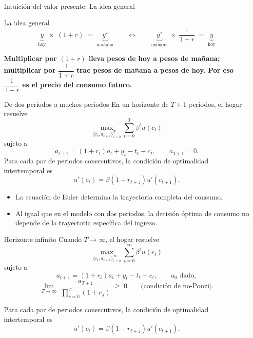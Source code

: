 \documentclass[aspectratio=169,11pt]{beamer}
\newcommand{\cidehighlight}[1]{\textcolor{CIDEBlue}{\bfseries #1}}
\newcommand{\notafuentes}[1]{\note{[Sources] #1}}
\begin{document}
\begin{frame}{Intuición del valor presente: La idea general}
    \vspace{0.5em}
  \begin{block}{La idea general}
    \[
      \underbrace{y}_{\text{hoy}} \;\times\; (1+r) \;=\; \underbrace{y'}_{\text{mañana}}
      \qquad\Longleftrightarrow\qquad
      \underbrace{y'}_{\text{mañana}} \;\times\; \frac{1}{1+r} \;=\; \underbrace{y}_{\text{hoy}}
    \]
  \end{block}

  \cidehighlight{Multiplicar por \((1+r)\) lleva pesos de hoy a pesos de
  mañana; multiplicar por \(\dfrac{1}{1+r}\) trae pesos de mañana a pesos de
  hoy. Por eso \(\dfrac{1}{1+r}\) es el \textbf{precio} del consumo futuro.}
  \hyperlink{RP}{}
\end{frame}


\begin{frame}{De dos periodos a muchos periodos}
  En un horizonte de \(T+1\) periodos, el hogar resuelve
  \[
    \max_{\{c_t,a_{t+1}\}_{t=0}^{T}}
    \sum_{t=0}^{T}\beta^t u(c_t)
  \]
  sujeto a
  \[
    a_{t+1}=(1+r_t)a_t+y_t-t_t-c_t,
    \qquad a_{T+1}=0.
  \]
  Para cada par de periodos consecutivos, la condición de optimalidad intertemporal es
  \[
    \boxed{u'(c_t)=\beta(1+r_{t+1})u'(c_{t+1})}.
  \]

  \begin{itemize}
    \item La ecuación de Euler determina la trayectoria completa del consumo.
    \item Al igual que en el modelo con dos periodos, la decisión óptima de consumo no depende de la trayectoria específica del ingreso.
  \end{itemize}
  \notafuentes{Kurlat (2020), sec. 6.3.}
\end{frame}

\begin{frame}{Horizonte infinito}
  Cuando \(T \to \infty\), el hogar resuelve
  \[
    \max_{\{c_t,a_{t+1}\}_{t=0}^{\infty}}
    \sum_{t=0}^{\infty}\beta^t u(c_t)
  \]
  sujeto a
  \[
    a_{t+1}=(1+r_t)a_t+y_t-t_t-c_t,
    \qquad a_0 \text{ dado},
  \]
  \[
    \lim_{T\to\infty}\;
    \frac{a_{T+1}}{\displaystyle\prod_{s=0}^{T}(1+r_s)} \;\geq\; 0
    \qquad \text{(condición de no-Ponzi)}.
  \]

  \vspace{0.3em}
  Para cada par de periodos consecutivos, la condición de optimalidad
  intertemporal es
  \[
    \boxed{u'(c_t)=\beta(1+r_{t+1})u'(c_{t+1})}.
  \]
\end{frame}
\end{document}
